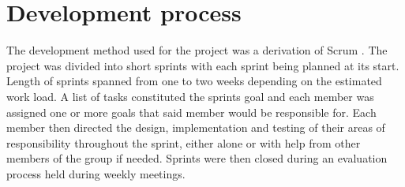 \section{Development process}


The development method used for the project was a derivation of Scrum \cite{Scrum}. The project
was divided into short sprints with each sprint being planned at its start. Length of sprints 
spanned from one to two weeks depending on the estimated work load. A list
of tasks constituted the sprints goal and each member was assigned one or more goals
that said member would be responsible for. Each member then directed the design,
implementation and testing of their areas of responsibility throughout the sprint, either alone or
with help from other members of the group if needed. Sprints were then closed during an
evaluation process held during weekly meetings.
